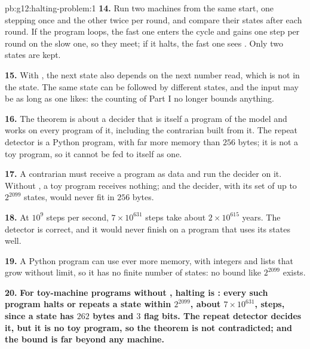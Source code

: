\begin{solution}{pb:g12:halting-problem:1}
\textbf{14.} Run two machines from the same start, one stepping once and the other twice per round, and compare their
states after each round. If the program loops, the fast one enters the cycle and gains one step per round on the slow
one, so they meet; if it halts, the fast one sees . Only two states are kept.

\textbf{15.} With , the next state also depends on the next number read, which is not in the state. The
same state can be followed by different states, and the input may be as long as one likes: the counting of Part I
no longer bounds anything.

\textbf{16.} The theorem is about a decider that is itself a program of the model and works on every program of it,
including the contrarian built from it. The repeat detector is a Python program, with far more memory than $256$
bytes; it is not a toy program, so it cannot be fed to itself as one.

\textbf{17.} A contrarian must receive a program as data and run the decider on it. Without , a toy program
receives nothing; and the decider, with its set of up to $2^{2099}$ states, would never fit in $256$ bytes.

\textbf{18.} At $10^9$ steps per second, $7 \times 10^{631}$ steps take about $2 \times 10^{615}$ years. The
detector is correct, and it would never finish on a program that uses its states well.

\textbf{19.} A Python program can use ever more memory, with integers and lists that grow without limit, so it has no
finite number of states: no bound like $2^{2099}$ exists.

\textbf{20.} \textbf{For toy-machine programs without , halting is : every such program halts or
repeats a state within $2^{2099}$, about $7 \times 10^{631}$, steps, since a state has $262$ bytes and $3$ flag bits.
The repeat detector decides it, but it is no toy program, so the theorem is not contradicted; and the bound is far
beyond any machine.}
\end{solution}
